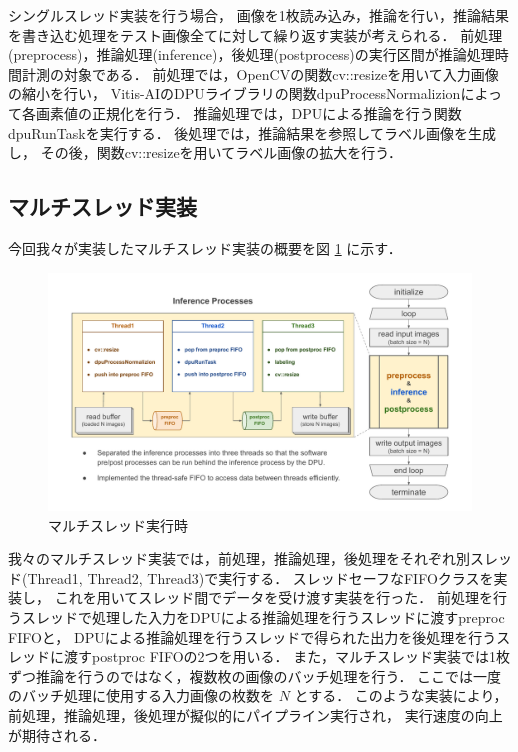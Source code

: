 シングルスレッド実装を行う場合，
画像を1枚読み込み，推論を行い，推論結果を書き込む処理をテスト画像全てに対して繰り返す実装が考えられる．
前処理(preprocess)，推論処理(inference)，後処理(postprocess)の実行区間が推論処理時間計測の対象である．
前処理では，OpenCVの関数cv::resizeを用いて入力画像の縮小を行い，
Vitis-AIのDPUライブラリの関数dpuProcessNormalizionによって各画素値の正規化を行う．
推論処理では，DPUによる推論を行う関数dpuRunTaskを実行する．
後処理では，推論結果を参照してラベル画像を生成し，
その後，関数cv::resizeを用いてラベル画像の拡大を行う．

\subsection{マルチスレッド実装}
今回我々が実装したマルチスレッド実装の概要を図 \ref{fig:multithread} に示す．

\begin{figure}[h]
  \begin{center}
    \includegraphics[width=\linewidth]{figures/sw_opt_flowchart_multithread.pdf}
    \caption{マルチスレッド実行時}
    \label{fig:multithread}
  \end{center}
\end{figure}

我々のマルチスレッド実装では，前処理，推論処理，後処理をそれぞれ別スレッド(Thread1, Thread2, Thread3)で実行する．
スレッドセーフなFIFOクラスを実装し，
これを用いてスレッド間でデータを受け渡す実装を行った．
前処理を行うスレッドで処理した入力をDPUによる推論処理を行うスレッドに渡すpreproc FIFOと，
DPUによる推論処理を行うスレッドで得られた出力を後処理を行うスレッドに渡すpostproc FIFOの2つを用いる．
また，マルチスレッド実装では1枚ずつ推論を行うのではなく，複数枚の画像のバッチ処理を行う．
ここでは一度のバッチ処理に使用する入力画像の枚数を $N$ とする．
このような実装により，前処理，推論処理，後処理が擬似的にパイプライン実行され，
実行速度の向上が期待される．

